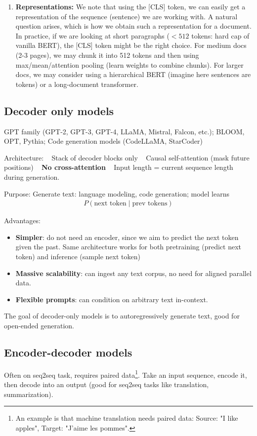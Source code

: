 \documentclass[11pt]{article}  %
\begin{document}
\begin{enumerate}
  \item \textbf{Representations:}
  We note that using the [CLS] token, we can easily get a representation of the sequence (sentence) we are working with. 
  A natural question arises, which is how we obtain such a representation for a document.
  In practice, if we are looking at short paragraphs ($< 512$ tokens: hard cap of vanilla BERT), the [CLS] token might be the right choice. 
  For medium docs (2-3 pages), we may chunk it into 512 tokens and then using max/mean/attention pooling (learn weights to combine chunks).
  For larger docs, we may consider using a hierarchical BERT (imagine here sentences are tokens) or a long-document transformer.
\end{enumerate}




\subsection{Decoder only models}

GPT family (GPT-2, GPT-3, GPT-4, LLaMA, Mistral, Falcon, etc.); BLOOM, OPT, Pythia; Code generation models (CodeLLaMA, StarCoder)

Architecture: \textbullet~ Stack of decoder blocks only \textbullet~ Causal self-attention (mask future positions) \textbullet~ \textbf{No cross-attention} \textbullet~ Input length = current sequence length during generation.

Purpose: Generate text: language modeling, code generation; model learns 
\begin{align*}
  P(\text{next token} \mid \text{prev tokens})
\end{align*}

Advantages:
\begin{itemize}
  \item \textbf{Simpler}: do not need an encoder, since we aim to predict the next token given the past. Same architecture works for both pretraining (predict next token) and inference (sample next token)
  \item \textbf{Massive scalability}: can ingest any text corpus, no need for aligned parallel data.
  \item \textbf{Flexible prompts}: can condition on arbitrary text in-context.
\end{itemize}

The goal of decoder-only models is to autoregressively generate text, good for open-ended generation.


\subsection{Encoder-decoder models}
Often on seq2seq task, requires paired data\footnote{An example is that machine translation needs paired data: Source: "I like apples", Target: "J'aime les pommes".}. 
Take an input sequence, encode it, then decode into an output (good for seq2seq tasks like translation, summarization).
\end{document}
